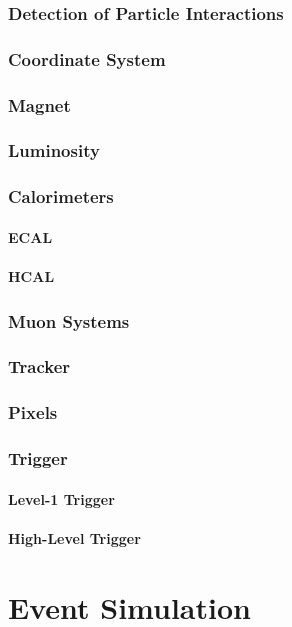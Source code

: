 \documentclass [11pt, twoside] {uwthesis}
\begin{document}
\subsection{Detection of Particle Interactions}
\subsection{Coordinate System}
\subsection{Magnet}
\subsection{Luminosity}
\subsection{Calorimeters}
\subsubsection{ECAL}
\subsubsection{HCAL}
\subsection{Muon Systems}
\subsection{Tracker}
\subsection{Pixels}
\subsection{Trigger}
\subsubsection{Level-1 Trigger}
\subsubsection{High-Level Trigger}
\chapter{Event Simulation}
\end{document}
